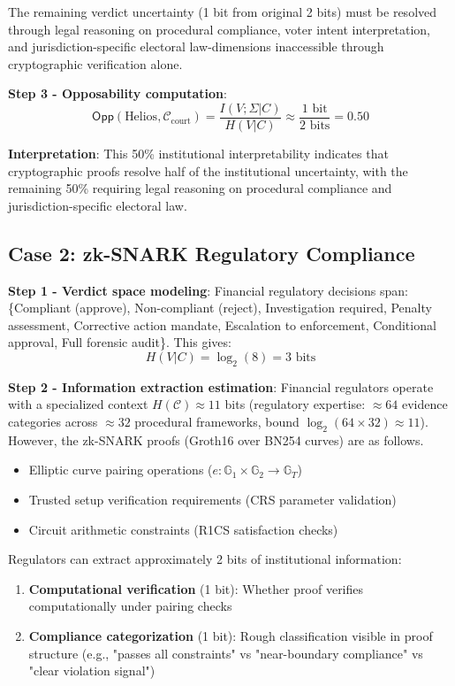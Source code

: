 \documentclass{ieeeaccess}
\begin{document}
The remaining verdict uncertainty (1 bit from original 2 bits) must be resolved through legal reasoning on procedural compliance, voter intent interpretation, and jurisdiction-specific electoral law-dimensions inaccessible through cryptographic verification alone.

\textbf{Step 3 - Opposability computation}:
\begin{equation}
\mathsf{Opp}(\text{Helios}, \mathcal{C}_{\text{court}}) = \frac{I(V;\Sigma|C)}{H(V|C)} \approx \frac{1 \text{ bit}}{2 \text{ bits}} = 0.50
\end{equation}

\textbf{Interpretation}: This 50\% institutional interpretability indicates that cryptographic proofs resolve half of the institutional uncertainty, with the remaining 50\% requiring legal reasoning on procedural compliance and jurisdiction-specific electoral law.

\subsection{Case 2: zk-SNARK Regulatory Compliance}\label{app:zksnark}

\textbf{Step 1 - Verdict space modeling}: Financial regulatory decisions span: \{Compliant (approve), Non-compliant (reject), Investigation required, Penalty assessment, Corrective action mandate, Escalation to enforcement, Conditional approval, Full forensic audit\}. This gives:
\begin{equation}
H(V|C) = \log_2(8) = 3 \text{ bits}
\end{equation}

\textbf{Step 2 - Information extraction estimation}: Financial regulators operate with a specialized context $H(\mathcal{C}) \approx 11$ bits (regulatory expertise: $\approx 64$ evidence categories across $\approx 32$ procedural frameworks, bound $\log_2(64 \times 32) \approx 11$). However, the zk-SNARK proofs (Groth16 over BN254 curves) are as follows.
\begin{itemize}
\item Elliptic curve pairing operations ($e: \mathbb{G}_1 \times \mathbb{G}_2 \to \mathbb{G}_T$)
\item Trusted setup verification requirements (CRS parameter validation)
\item Circuit arithmetic constraints (R1CS satisfaction checks)
\end{itemize}

Regulators can extract approximately 2 bits of institutional information:
\begin{enumerate}
\item \textbf{Computational verification} (1 bit): Whether proof verifies computationally under pairing checks
\item \textbf{Compliance categorization} (1 bit): Rough classification visible in proof structure (e.g., "passes all constraints" vs "near-boundary compliance" vs "clear violation signal")
\end{enumerate}
\end{document}
